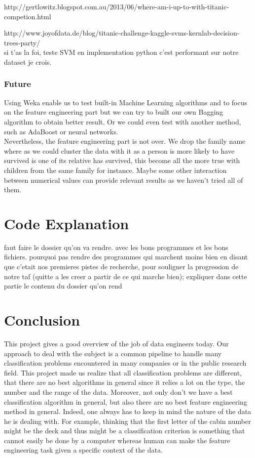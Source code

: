 \documentclass[11pt,a4paper,portrait]{article}
\begin{document}
http://gertlowitz.blogspot.com.au/2013/06/where-am-i-up-to-with-titanic-competion.html

http://www.joyofdata.de/blog/titanic-challenge-kaggle-svms-kernlab-decision-trees-party/
\\
si t'as la foi, teste SVM en implementation python c'est performant sur notre dataset je crois.\\


\section{Future}
Using Weka enable us to test built-in Machine Learning algorithms and to focus on the feature engineering part but we can try to built our own Bagging algorithm to obtain better result. Or we could even test with another method, such as AdaBoost or neural networks.\\
Nevertheless, the feature engineering part is not over. We drop the family name where as we could cluster the data with it as a person is more likely to have survived is one of its relative has survived, this become all the more true with children from the same family for instance. Maybe some other interaction between numerical values can provide relevant results as we haven't tried all of them.


\part*{Code Explanation}
faut faire le dossier qu'on va rendre. avec les bons programmes et les bons fichiers. pourquoi pas rendre des programmes qui marchent moins bien en disant que c'etait nos premieres pistes de recherche, pour souligner la progression de notre taf (quitte a les creer a partir de ce qui marche bien);
expliquer dans cette partie le contenu du dossier qu'on rend

\part*{Conclusion}
This project gives a good overview of the job of data engineers today. Our approach to deal with the subject is a common pipeline to handle many classification problems encountered in many companies or in the public research field. This project made us realize that all classification problems are different, that there are no best algorithms in general since it relies a lot on the type, the number and the range of the data. Moreover, not only don't we have a best classification algorithm in general, but also there are no best feature engineering method in general. Indeed, one always has to keep in mind the nature of the data he is dealing with. For example, thinking that the first letter of the cabin number might be the deck and thus might be a classification criterion is something that cannot easily be done by a computer whereas human can make the feature engineering task given a specific context of the data.
\end{document}
